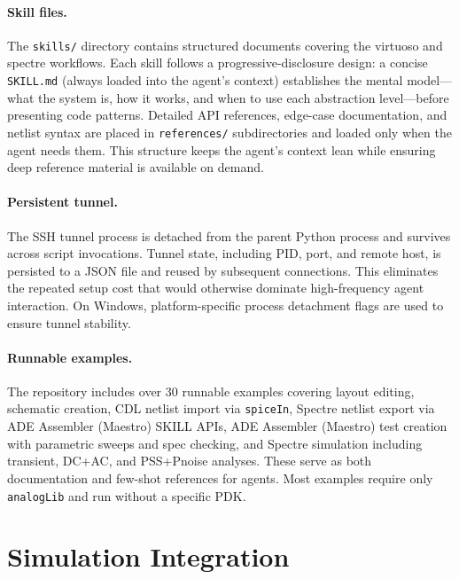 \documentclass[lettersize,journal]{ieee_template/IEEEtran}
\begin{document}
\paragraph{Skill files.} The \texttt{skills/} directory contains structured documents covering the virtuoso and spectre workflows. Each skill follows a progressive-disclosure design: a concise \texttt{SKILL.md} (always loaded into the agent's context) establishes the mental model---what the system is, how it works, and when to use each abstraction level---before presenting code patterns. Detailed API references, edge-case documentation, and netlist syntax are placed in \texttt{references/} subdirectories and loaded only when the agent needs them. This structure keeps the agent's context lean while ensuring deep reference material is available on demand.

\paragraph{Persistent tunnel.} The SSH tunnel process is detached from the parent Python process and survives across script invocations. Tunnel state, including PID, port, and remote host, is persisted to a JSON file and reused by subsequent connections. This eliminates the repeated setup cost that would otherwise dominate high-frequency agent interaction. On Windows, platform-specific process detachment flags are used to ensure tunnel stability.

\paragraph{Runnable examples.} The repository includes over 30 runnable examples covering layout editing, schematic creation, CDL netlist import via \texttt{spiceIn}, Spectre netlist export via ADE Assembler (Maestro) SKILL APIs, ADE Assembler (Maestro) test creation with parametric sweeps and spec checking, and Spectre simulation including transient, DC+AC, and PSS+Pnoise analyses. These serve as both documentation and few-shot references for agents. Most examples require only \texttt{analogLib} and run without a specific PDK.

\section{Simulation Integration}
\end{document}
